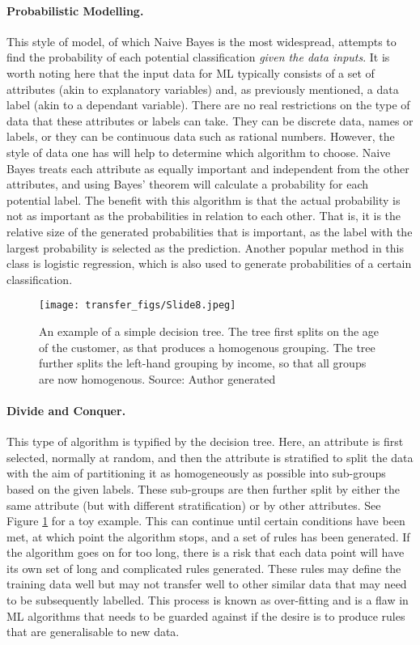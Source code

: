 \paragraph{Probabilistic Modelling.} This style of model, of which Naive Bayes is the most widespread, attempts to find the probability of each potential classification \emph{given the data inputs}. It is worth noting here that the input data for ML typically consists of a set of attributes (akin to explanatory variables) and, as previously mentioned, a data label (akin to a dependant variable). There are no real restrictions on the type of data that these attributes or labels can take. They can be discrete data, names or labels, or they can be continuous data such as rational numbers. However, the style of data one has will help to determine which algorithm to choose. Naive Bayes treats each attribute as equally important and independent from the other attributes, and using Bayes’ theorem will calculate a probability for each potential label. The benefit with this algorithm is that the actual probability is not as important as the probabilities in relation to each other. That is, it is the relative size of the generated probabilities that is important, as the label with the largest probability is selected as the prediction. Another popular method in this class is logistic regression, which is also used to generate probabilities of a certain classification.

\begin{figure}
  \texttt{[image: transfer\_figs/Slide8.jpeg]}
  \caption[Decision tree example.]{An example of a simple decision tree. The tree first splits on the age of the customer, as that produces a homogenous grouping. The tree further splits the left-hand grouping by income, so that all groups are now homogenous.  Source: Author generated }
  \label{fig:tree}
\end{figure}

\paragraph{Divide and Conquer.} This type of algorithm is typified by the decision tree. Here, an attribute is first selected, normally at random, and then the attribute is stratified to split the data with the aim of partitioning it as homogeneously as possible into sub-groups based on the given labels. These sub-groups are then further split by either the same attribute (but with different stratification) or by other attributes. See Figure \ref{fig:tree} for a toy example. This can continue until certain conditions have been met, at which point the algorithm stops, and a set of rules has been generated. If the algorithm goes on for too long, there is a risk that each data point will have its own set of long and complicated rules generated. These rules may define the training data well but may not transfer well to other similar data that may need to be subsequently labelled. This process is known as over-fitting and is a flaw in ML algorithms that needs to be guarded against if the desire is to produce rules that are generalisable to new data.

